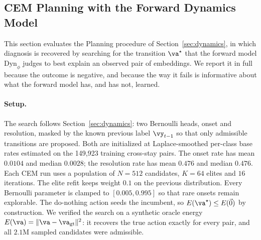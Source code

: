 
\subsection{CEM Planning with the Forward Dynamics Model}
\label{sec:cem-planning}

This section evaluates the Planning procedure of Section~\ref{sec:dynamics}, in which diagnosis is recovered by searching for the transition $\va^\star$ that the forward model $\text{Dyn}_\phi$ judges to best explain an observed pair of embeddings. We report it in full because the outcome is negative, and because the way it fails is informative about what the forward model has, and has not, learned.

\paragraph{Setup.} The search follows Section~\ref{sec:dynamics}: two Bernoulli heads, onset and resolution, masked by the known previous label $\vy_{t-1}$ so that only admissible transitions are proposed. Both are initialized at Laplace-smoothed per-class base rates estimated on the 149{,}923 training cross-stay pairs. The onset rate has mean $0.0104$ and median $0.0028$; the resolution rate has mean $0.476$ and median $0.476$. Each CEM run uses a population of $N=512$ candidates, $K=64$ elites and $16$ iterations. The elite refit keeps weight $0.1$ on the previous distribution. Every Bernoulli parameter is clamped to $[0.005, 0.995]$ so that rare onsets remain explorable. The do-nothing action seeds the incumbent, so $E(\va^\star)\le E(\vec 0)$ by construction. We verified the search on a synthetic oracle energy $E(\va)=\lVert\va-\va_{\text{gt}}\rVert^2$: it recovers the true action exactly for every pair, and all $2.1$M sampled candidates were admissible.

